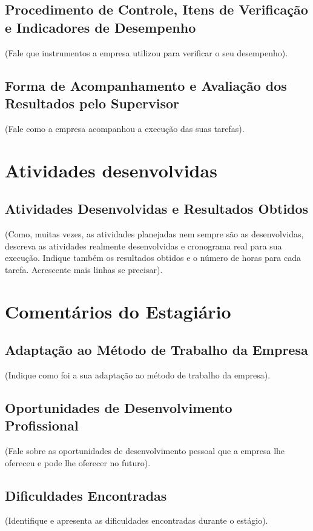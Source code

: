 \documentclass[
	12pt,				%
	openright,			%
	oneside,			%
	a4paper,			%
	english,			%
	french,				%
	spanish,			%
	brazil				%
	]{abntex2}
\begin{document}
\section{Procedimento de Controle, Itens de Verificação e Indicadores de
Desempenho}
(Fale que instrumentos a empresa utilizou para verificar o seu desempenho).

\section{Forma de Acompanhamento e Avaliação dos Resultados pelo
Supervisor}
(Fale como a empresa acompanhou a execução das suas tarefas).


\chapter{Atividades desenvolvidas}
\section{Atividades Desenvolvidas e Resultados Obtidos}

(Como, muitas vezes, as atividades planejadas nem sempre são as desenvolvidas,
descreva as atividades realmente desenvolvidas e cronograma real para sua execução.
Indique também os resultados obtidos e o número de horas para cada tarefa. Acrescente
mais linhas se precisar).

\chapter{Comentários do Estagiário}
\section{Adaptação ao Método de Trabalho da Empresa}
(Indique como foi a sua adaptação ao método de trabalho da empresa).

\section{Oportunidades de Desenvolvimento Profissional}
(Fale sobre as oportunidades de desenvolvimento pessoal que a empresa lhe ofereceu e pode lhe oferecer no futuro).

\section{Dificuldades Encontradas}
(Identifique e apresenta as dificuldades encontradas durante o estágio).
\end{document}
